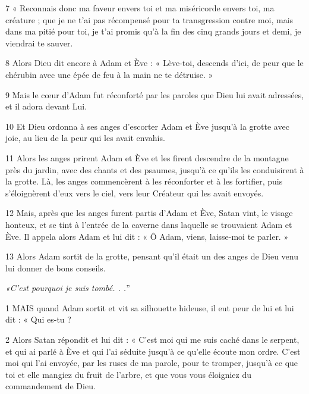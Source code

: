 \par 7 « Reconnais donc ma faveur envers toi et ma miséricorde envers toi, ma créature ; que je ne t'ai pas récompensé pour ta transgression contre moi, mais dans ma pitié pour toi, je t'ai promis qu'à la fin des cinq grands jours et demi, je viendrai te sauver.

\par 8 Alors Dieu dit encore à Adam et Ève : « Lève-toi, descends d'ici, de peur que le chérubin avec une épée de feu à la main ne te détruise. »

\par 9 Mais le cœur d'Adam fut réconforté par les paroles que Dieu lui avait adressées, et il adora devant Lui.

\par 10 Et Dieu ordonna à ses anges d'escorter Adam et Ève jusqu'à la grotte avec joie, au lieu de la peur qui les avait envahis.

\par 11 Alors les anges prirent Adam et Ève et les firent descendre de la montagne près du jardin, avec des chants et des psaumes, jusqu'à ce qu'ils les conduisirent à la grotte. Là, les anges commencèrent à les réconforter et à les fortifier, puis s'éloignèrent d'eux vers le ciel, vers leur Créateur qui les avait envoyés.

\par 12 Mais, après que les anges furent partis d'Adam et Ève, Satan vint, le visage honteux, et se tint à l'entrée de la caverne dans laquelle se trouvaient Adam et Ève. Il appela alors Adam et lui dit : « Ô Adam, viens, laisse-moi te parler. »

\par 13 Alors Adam sortit de la grotte, pensant qu'il était un des anges de Dieu venu lui donner de bons conseils.


\par \textit{«C'est pourquoi je suis tombé. . .}”

\par 1 MAIS quand Adam sortit et vit sa silhouette hideuse, il eut peur de lui et lui dit : « Qui es-tu ?

\par 2 Alors Satan répondit et lui dit : « C'est moi qui me suis caché dans le serpent, et qui ai parlé à Ève et qui l'ai séduite jusqu'à ce qu'elle écoute mon ordre. C'est moi qui l'ai envoyée, par les ruses de ma parole, pour te tromper, jusqu'à ce que toi et elle mangiez du fruit de l'arbre, et que vous vous éloigniez du commandement de Dieu.

